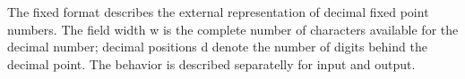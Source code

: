 The fixed format describes the external representation of decimal fixed
point numbers. The field width w is the complete number of characters
available for the decimal number; decimal positions d denote the number
of digits behind the decimal point. 
The behavior is described separatelly for input and output.

